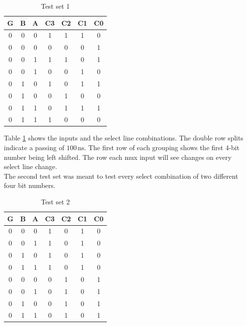 \documentclass[CMPE]{KGCOEReport}
\begin{document}
\begin{table}[htbp]
\renewcommand{\arraystretch}{1.2}
\begin{center}
\caption{Test set 1}
\begin{tabular}{|c|c|c|cccc|}
\hline
G & B & A & C3 & C2 & C1 & C0\\\hline
0 & 0 & 0 & 1 & 1 & 1 & 0\\\hline
0 & 0 & 0 & 0 & 0 & 0 & 1\\\hhline{|=|=|=|====|}
0 & 0 & 1 & 1 & 1 & 0 & 1\\\hline
0 & 0 & 1 & 0 & 0 & 1 & 0\\\hhline{|=|=|=|====|}
0 & 1 & 0 & 1 & 0 & 1 & 1\\\hline
0 & 1 & 0 & 0 & 1 & 0 & 0\\\hhline{|=|=|=|====|}
0 & 1 & 1 & 0 & 1 & 1 & 1\\\hline
0 & 1 & 1 & 1 & 0 & 0 & 0\\\hline
\end{tabular}
\label{tab:set1}
\end{center}
\end{table}

Table \ref{tab:set1} shows the inputs and the select line combinations. The double row splits indicate a passing of $100\,\si{\nano\s}$. The first row of each grouping shows the first 4-bit number being left shifted. The row each mux input will see changes on every select line change.\\

The second test set was meant to test every select combination of two different four bit numbers.
\pagebreak

\begin{table}[htbp]
\renewcommand{\arraystretch}{1.2}
\begin{center}
\caption{Test set 2}
\begin{tabular}{|c|c|c|cccc|}
\hline
G & B & A & C3 & C2 & C1 & C0\\\hline
0 & 0 & 0 & 1 & 0 & 1 & 0\\\hline
0 & 0 & 1 & 1 & 0 & 1 & 0\\\hline
0 & 1 & 0 & 1 & 0 & 1 & 0\\\hline
0 & 1 & 1 & 1 & 0 & 1 & 0\\\hhline{|=|=|=|====|}
0 & 0 & 0 & 0 & 1 & 0 & 1\\\hline
0 & 0 & 1 & 0 & 1 & 0 & 1\\\hline
0 & 1 & 0 & 0 & 1 & 0 & 1\\\hline
0 & 1 & 1 & 0 & 1 & 0 & 1\\\hline
\end{tabular}
\label{tab:set2}
\end{center}
\end{table}
\end{document}
